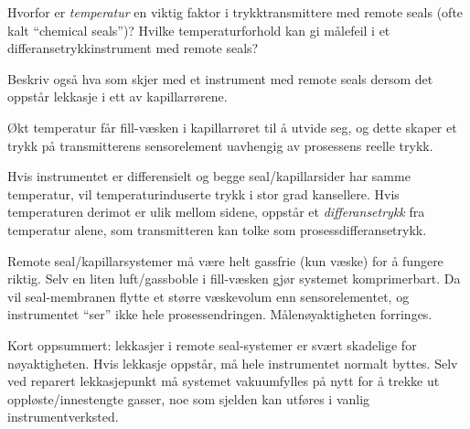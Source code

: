 

Hvorfor er \textit{temperatur} en viktig faktor i trykktransmittere med remote seals (ofte kalt ``chemical seals'')?  Hvilke temperaturforhold kan gi målefeil i et differansetrykkinstrument med remote seals?

\vskip 10pt

Beskriv også hva som skjer med et instrument med remote seals dersom det oppstår lekkasje i ett av kapillarrørene.







Økt temperatur får fill-væsken i kapillarrøret til å utvide seg, og dette skaper et trykk på transmitterens sensorelement uavhengig av prosessens reelle trykk.

Hvis instrumentet er differensielt og begge seal/kapillarsider har samme temperatur, vil temperaturinduserte trykk i stor grad kansellere.  Hvis temperaturen derimot er ulik mellom sidene, oppstår et \textit{differansetrykk} fra temperatur alene, som transmitteren kan tolke som prosessdifferansetrykk.

\vskip 10pt

Remote seal/kapillarsystemer må være helt gassfrie (kun væske) for å fungere riktig.  Selv en liten luft/gassboble i fill-væsken gjør systemet komprimerbart.  Da vil seal-membranen flytte et større væskevolum enn sensorelementet, og instrumentet ``ser'' ikke hele prosessendringen.  Målenøyaktigheten forringes.

Kort oppsummert: lekkasjer i remote seal-systemer er svært skadelige for nøyaktigheten.  Hvis lekkasje oppstår, må hele instrumentet normalt byttes.  Selv ved reparert lekkasjepunkt må systemet vakuumfylles på nytt for å trekke ut oppløste/innestengte gasser, noe som sjelden kan utføres i vanlig instrumentverksted.










